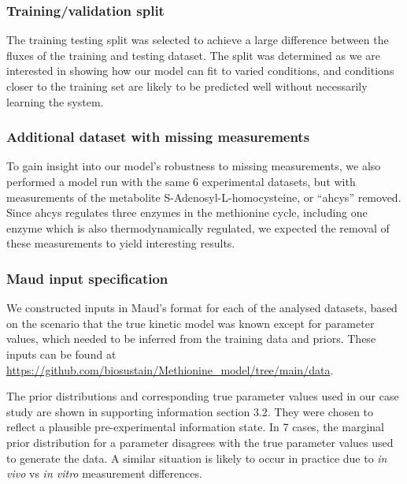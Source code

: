 \documentclass[journal=asbcd6,manuscript=article,layout=traditional]{achemso}
\begin{document}
\hypertarget{trainingvalidation-split}{%
\subsubsection{Training/validation
split}\label{trainingvalidation-split}}

The training testing split was selected to achieve a large difference
between the fluxes of the training and testing dataset. The split was
determined as we are interested in showing how our model can fit to
varied conditions, and conditions closer to the training set are likely
to be predicted well without necessarily learning the system.

\hypertarget{additional-dataset-with-missing-measurements}{%
\subsubsection{Additional dataset with missing
measurements}\label{additional-dataset-with-missing-measurements}}

To gain insight into our model's robustness to missing measurements, we
also performed a model run with the same 6 experimental datasets, but
with measurements of the metabolite S-Adenosyl-L-homocysteine, or
``ahcys'' removed. Since ahcys regulates three enzymes in the methionine
cycle, including one enzyme which is also thermodynamically regulated,
we expected the removal of these measurements to yield interesting
results.

\hypertarget{maud-input-specification}{%
\subsubsection{Maud input
specification}\label{maud-input-specification}}

We constructed inputs in Maud's format for each of the analysed
datasets, based on the scenario that the true kinetic model was known
except for parameter values, which needed to be inferred from the
training data and priors. These inputs can be found at
\url{https://github.com/biosustain/Methionine_model/tree/main/data}.

The prior distributions and corresponding true parameter values used in
our case study are shown in supporting information section 3.2. They
were chosen to reflect a plausible pre-experimental information state.
In 7 cases, the marginal prior distribution for a parameter disagrees
with the true parameter values used to generate the data. A similar
situation is likely to occur in practice due to \emph{in vivo} vs
\emph{in vitro} measurement differences.
\end{document}
